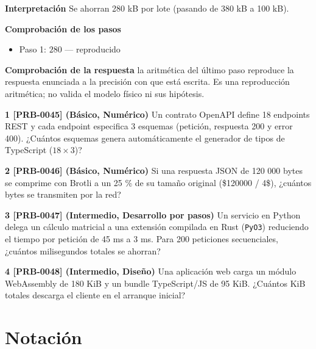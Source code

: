 \documentclass{book}
\begin{document}
\begin{tcolorbox}[title={Problema resuelto}, studiumworked, breakable]
\noindent\textbf{Interpretación}
Se ahorran 280 kB por lote (pasando de 380 kB a 100 kB).

\noindent\textbf{Comprobación de los pasos}
\begin{itemize}
\item Paso 1: $280$ — reproducido
\end{itemize}

\noindent\textbf{Comprobación de la respuesta} la aritmética del último paso reproduce la respuesta enunciada a la precisión con que está escrita. Es una reproducción aritmética; no valida el modelo físico ni sus hipótesis.
\end{tcolorbox}

\begin{tcolorbox}[title={Ejercicios}, studiumworked, breakable]

\noindent\textbf{1 [PRB-0045] (Básico, Numérico)}
Un contrato OpenAPI define 18 endpoints REST y cada endpoint especifica 3 esquemas (petición, respuesta 200 y error 400). ¿Cuántos esquemas genera automáticamente el generador de tipos de TypeScript (\(18 \times 3\))?

\noindent\textbf{2 [PRB-0046] (Básico, Numérico)}
Si una respuesta JSON de 120 000 bytes se comprime con Brotli a un 25 \% de su tamaño original (\$120000 / 4\$), ¿cuántos bytes se transmiten por la red?

\noindent\textbf{3 [PRB-0047] (Intermedio, Desarrollo por pasos)}
Un servicio en Python delega un cálculo matricial a una extensión compilada en Rust (\texttt{PyO3}) reduciendo el tiempo por petición de 45 ms a 3 ms. Para 200 peticiones secuenciales, ¿cuántos milisegundos totales se ahorran?

\noindent\textbf{4 [PRB-0048] (Intermedio, Diseño)}
Una aplicación web carga un módulo WebAssembly de 180 KiB y un bundle TypeScript/JS de 95 KiB. ¿Cuántos KiB totales descarga el cliente en el arranque inicial?
\end{tcolorbox}
\appendix
\chapter{Notación}
\end{document}
